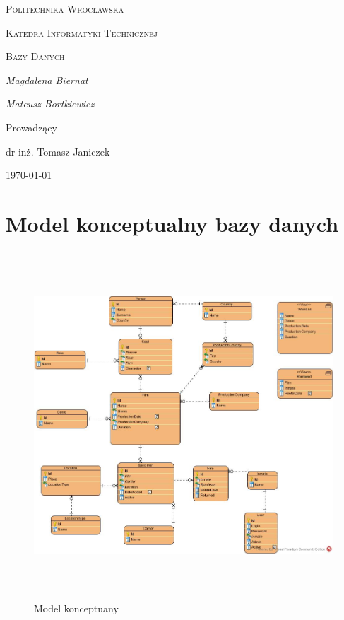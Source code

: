 \documentclass{article}
\begin{document}
	
	\begin{titlepage}
		\centering
		{\scshape\LARGE Politechnika Wrocławska \par}
		{\scshape\Large Katedra Informatyki Technicznej\par}
		
		\vspace{1.5cm}
		{\scshape\Huge Bazy Danych \par}
		\vspace{1.5cm}
		
		\vspace{2cm}
		{\Large\itshape Magdalena Biernat\par}
		{\Large\itshape Mateusz Bortkiewicz\par}
		\vfill\flushleft\large
		
		\normalsize	\centering	\vspace{3cm}
		Prowadzący\par
		dr inż. Tomasz Janiczek 
		
		\vfill
		{\large \today\par}
	\end{titlepage}
	\newpage
	\section{Model konceptualny bazy danych}
	\begin{figure}[!ht]	
		\centering
		\includegraphics[height=13cm]{model_konceptualny.jpg}
		\caption{Model konceptuany}
		\label{fig:obrazek 0}
	\end{figure}
	\newpage
\end{document}
